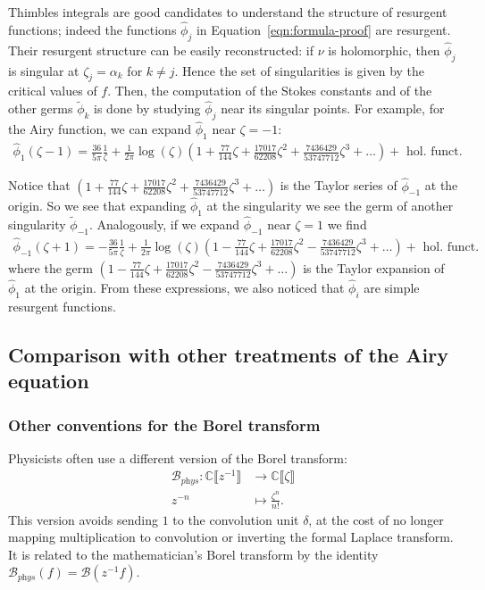 \documentclass{article}
\newcommand{\maps}{\colon}
\newcommand{\C}{\mathbb{C}}
\newcommand{\series}[1]{\tilde{#1}}
\newcommand{\borel}{\mathcal{B}}
\theoremstyle{definition}
\theoremstyle{plain}
\begin{document}
Thimbles integrals are good candidates to understand the structure of resurgent functions; indeed the functions $\hat{\phi}_j$ in Equation~\eqref{eqn:formula-proof} are resurgent. Their resurgent structure can be easily reconstructed: if $\nu$ is holomorphic, then $\hat{\phi}_j$ is singular at $\zeta_j=\alpha_k$ for $k\neq j$. Hence the set of singularities is given by the critical values of $f$. Then, the computation of the Stokes constants and of the other germs $\series{\phi}_k$ is done by studying $\hat{\phi}_j$ near its singular points. For example, for the Airy function, we can expand $\hat{\phi}_1$ near $\zeta=-1$:
\begin{align*}
    \hat{\phi}_1(\zeta-1)=\frac{36}{5\pi}\frac{1}{\zeta}+\frac{1}{2\pi}\log(\zeta) \left(1+\frac{77}{144}\zeta+\frac{17017}{62208}\zeta^2+\frac{7436429}{53747712}\zeta^3+\ldots\right)  +\text{ hol. funct. }
\end{align*}

Notice that $(1+\tfrac{77}{144}\zeta+\tfrac{17017}{62208}\zeta^2+\tfrac{7436429}{53747712}\zeta^3+\ldots)$ is the Taylor series of $\hat{\phi}_{-1}$ at the origin. So we see that expanding $\hat{\phi}_1$ at the singularity we see the germ of another singularity $\series{\phi}_{-1}$. Analogously, if we expand $\hat{\phi}_{-1}$ near $\zeta=1$ we find
\begin{align*}
    \hat{\phi}_{-1}(\zeta+1)=-\frac{36}{5\pi}\frac{1}{\zeta}+\frac{1}{2\pi}\log(\zeta) \left(1-\frac{77}{144}\zeta+\frac{17017}{62208}\zeta^2-\frac{7436429}{53747712}\zeta^3+\ldots\right) +\text{ hol. funct. }
\end{align*}
where the germ $(1-\tfrac{77}{144}\zeta+\tfrac{17017}{62208}\zeta^2-\tfrac{7436429}{53747712}\zeta^3+\ldots)$ is the Taylor expansion of $\hat{\phi}_1$ at the origin. 
From these expressions, we also noticed that $\hat{\phi}_i$ are simple resurgent functions.   
%
\subsection{Comparison with other treatments of the Airy equation}
%
\subsubsection{Other conventions for the Borel transform}
%
Physicists often use a different version of the Borel transform:
\begin{align*}
\borel_{\textit{phys}} \maps \C \llbracket z^{-1} \rrbracket & \to \C \llbracket \zeta \rrbracket \\
z^{-n} & \mapsto \frac{\zeta^n}{n!}.
\end{align*}
This version avoids sending $1$ to the convolution unit $\delta$, at the cost of no longer mapping multiplication to convolution or inverting the formal Laplace transform. It is related to the mathematician's Borel transform by the identity $\borel_\textit{phys}(f) = \borel(z^{-1} f)$.
\end{document}
